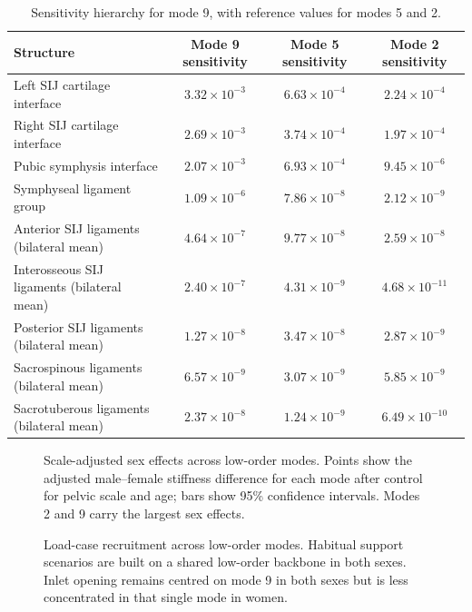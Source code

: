 \documentclass[openacc]{rsproca_new}
\begin{document}
\begin{table}[p]
\centering
\caption{Sensitivity hierarchy for mode 9, with reference values for modes 5 and 2.}
\label{tab:sensitivity}
\begin{tabular}{lccc}
\toprule
Structure & Mode 9 sensitivity & Mode 5 sensitivity & Mode 2 sensitivity \\
\midrule
Left SIJ cartilage interface & $3.32 \times 10^{-3}$ & $6.63 \times 10^{-4}$ & $2.24 \times 10^{-4}$ \\
Right SIJ cartilage interface & $2.69 \times 10^{-3}$ & $3.74 \times 10^{-4}$ & $1.97 \times 10^{-4}$ \\
Pubic symphysis interface & $2.07 \times 10^{-3}$ & $6.93 \times 10^{-4}$ & $9.45 \times 10^{-6}$ \\
Symphyseal ligament group & $1.09 \times 10^{-6}$ & $7.86 \times 10^{-8}$ & $2.12 \times 10^{-9}$ \\
Anterior SIJ ligaments (bilateral mean) & $4.64 \times 10^{-7}$ & $9.77 \times 10^{-8}$ & $2.59 \times 10^{-8}$ \\
Interosseous SIJ ligaments (bilateral mean) & $2.40 \times 10^{-7}$ & $4.31 \times 10^{-9}$ & $4.68 \times 10^{-11}$ \\
Posterior SIJ ligaments (bilateral mean) & $1.27 \times 10^{-8}$ & $3.47 \times 10^{-8}$ & $2.87 \times 10^{-9}$ \\
Sacrospinous ligaments (bilateral mean) & $6.57 \times 10^{-9}$ & $3.07 \times 10^{-9}$ & $5.85 \times 10^{-9}$ \\
Sacrotuberous ligaments (bilateral mean) & $2.37 \times 10^{-8}$ & $1.24 \times 10^{-9}$ & $6.49 \times 10^{-10}$ \\
\bottomrule
\end{tabular}
\end{table}

\begin{figure}[p]
\centering
{}
\caption{Scale-adjusted sex effects across low-order modes. Points show the adjusted male--female stiffness difference for each mode after control for pelvic scale and age; bars show 95\% confidence intervals. Modes 2 and 9 carry the largest sex effects.}
\label{fig:sexeffects}
\end{figure}

\begin{figure}[p]
\centering
{}
\caption{Load-case recruitment across low-order modes. Habitual support scenarios are built on a shared low-order backbone in both sexes. Inlet opening remains centred on mode 9 in both sexes but is less concentrated in that single mode in women.}
\label{fig:recruitment}
\end{figure}
\end{document}
